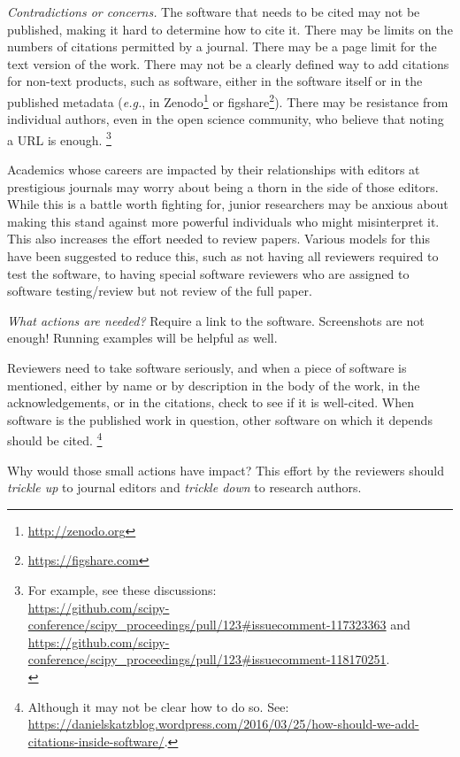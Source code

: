 \documentclass[a4paper,UKenglish]{dagman}
\newcommand{\eg}{\emph{e.g.},\xspace}
\begin{document}
\emph{Contradictions or concerns.} The software that needs to be cited may not be published, making it hard to determine how to cite it.  There may be limits on the numbers of citations permitted by a journal.  There may be a page limit for the text version of the work.  There may not be a clearly defined way to add citations for non-text products, such as software, either in the software itself or in the published metadata (\eg in Zenodo\footnote{\url{http://zenodo.org} } or figshare\footnote{\url{https://figshare.com}}).
There may be resistance from individual authors, even in the open science community, who believe that noting a URL is enough.%
\footnote{For example, see these discussions:\\
\url{https://github.com/scipy-conference/scipy_proceedings/pull/123\#issuecomment-117323363} and\\
\url{https://github.com/scipy-conference/scipy_proceedings/pull/123\#issuecomment-118170251}.\\
}

Academics whose careers are impacted by their relationships with editors at prestigious journals may worry about being a thorn in the side of those editors. While this is a battle worth fighting for, junior researchers may be anxious about making this stand against more powerful individuals who might misinterpret it. 
This also increases the effort needed to review papers.  Various models for this have been suggested to reduce this, such as not having all reviewers required to test the software, to having special software reviewers who are assigned to software testing/review but not review of the full paper.


\emph{What actions are needed?}
Require a link to the software. Screenshots are not enough! Running examples will be helpful as well.

Reviewers need to take software seriously, and when a piece of software is mentioned, either by name or by description in the body of the work, in the acknowledgements, or in the citations, check to see if it is well-cited.  When software is the published work in question, other software on which it depends should be cited.%
\footnote{Although it may not be clear how to do so. See:\\ \url{https://danielskatzblog.wordpress.com/2016/03/25/how-should-we-add-citations-inside-software/}.}


Why would those small actions have impact? This effort by the reviewers should \emph{trickle up} to journal editors and \emph{trickle down} to research authors.
\end{document}
